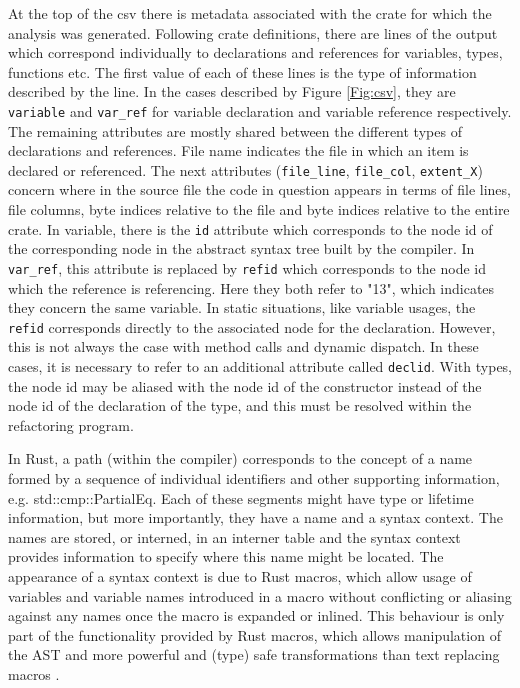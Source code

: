 At the top of the csv there is metadata associated with the crate for which the analysis was generated. Following crate definitions, there are lines of the output which correspond individually to declarations and references for variables, types, functions etc. The first value of each of these lines is the type of information described by the line. In the cases described by Figure \ref{Fig:csv}, they are {\verb|variable|} and {\verb|var_ref|} for variable declaration and variable reference respectively. The remaining attributes are mostly shared between the different types of declarations and references. File name indicates the file in which an item is declared or referenced. The next attributes ({\verb|file_line|}, {\verb|file_col|}, {\verb|extent_X|}) concern where in the source file the code in question appears in terms of file lines, file columns, byte indices relative to the file and byte indices relative to the entire crate. In variable, there is the {\verb|id|} attribute which corresponds to the node id of the corresponding node in the abstract syntax tree built by the compiler. In {\verb|var_ref|}, this attribute is replaced by {\verb|refid|} which corresponds to the node id which the reference is referencing. Here they both refer to "13", which indicates they concern the same variable. In static situations, like variable usages, the {\verb|refid|} corresponds directly to the associated node for the declaration. However, this is not always the case with method calls and dynamic dispatch. In these cases, it is necessary to refer to an additional attribute called {\verb|declid|}. With types, the node id may be aliased with the node id of the constructor instead of the node id of the declaration of the type, and this must be resolved within the refactoring program.

In Rust, a path (within the compiler) corresponds to the concept of a name formed by a sequence of individual identifiers and other supporting information, e.g. std::cmp::PartialEq. Each of these segments might have type or lifetime information, but more importantly, they have a name and a syntax context. The names are stored, or interned, in an interner table and the syntax context provides information to specify where this name might be located. The appearance of a syntax context is due to Rust macros, which allow usage of variables and variable names introduced in a macro without conflicting or aliasing against any names once the macro is expanded or inlined. This behaviour is only part of the functionality provided by Rust macros, which allows manipulation of the AST and more powerful and (type) safe transformations than text replacing macros \cite{keep15}.

